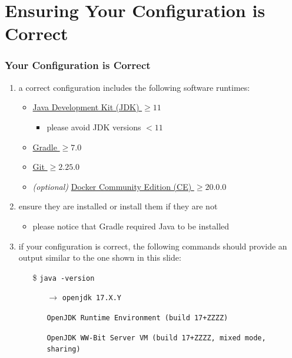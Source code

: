 \documentclass[presentation]{beamer}\mode<presentation>{\usetheme{AMSBolognaFC}}
\begin{document}
\section{Ensuring Your Configuration is Correct}

\begin{frame}[c,allowframebreaks]
\frametitle{Your Configuration is Correct}

    \begin{enumerate}

    \item a correct configuration includes the following software runtimes:
    \begin{itemize}
        \item \href{https://www.oracle.com/java/technologies/downloads/}{Java Development Kit (JDK) $\geq 11$}
        \begin{itemize}
            \item \alert{please avoid JDK versions $< 11$}
        \end{itemize}
        \item \href{https://gradle.org/releases}{Gradle $\geq 7.0$}
        \item \href{https://git-scm.com}{Git $\geq 2.25.0$}
        \item \emph{(optional)} \href{https://www.docker.com/products/docker-desktop}{Docker Community Edition (CE) $\geq 20.0.0$}
    \end{itemize}

    \item ensure they are installed or install them if they are not
    \begin{itemize}
        \item please notice that Gradle required Java to be installed
    \end{itemize}

    \framebreak

    \item if your configuration is correct, the following commands should provide an output similar to the one shown in this slide:
    \begin{itemize}
        \item[\$] \texttt{java -version}
        \begin{itemize}
            \item[$\rightarrow$] \texttt{openjdk 17.X.Y}
            \item[] \texttt{OpenJDK Runtime Environment (build 17+ZZZZ)}
            \item[] \texttt{OpenJDK WW-Bit Server VM (build 17+ZZZZ, mixed mode, sharing)}
        \end{itemize}


\end{itemize}
\end{enumerate}
\end{frame}
\end{document}

